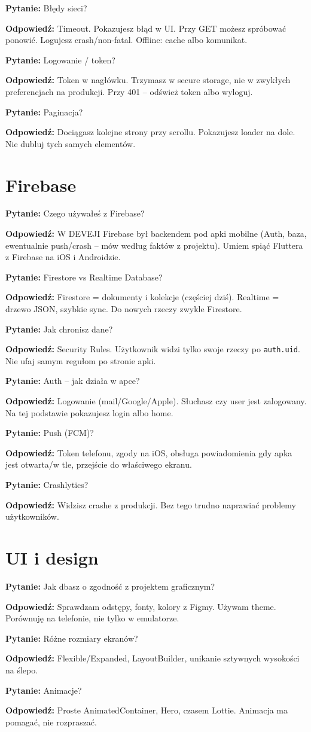 \documentclass[11pt,a4paper]{article}
\newcommand{\pyt}[1]{\par\medskip\noindent\textbf{Pytanie:} #1\par}
\newcommand{\odp}[1]{\noindent\textbf{Odpowiedź:} #1\par}
\begin{document}
\pyt{Błędy sieci?}
\odp{Timeout. Pokazujesz błąd w UI. Przy GET możesz spróbować ponowić. Logujesz crash/non-fatal. Offline: cache albo komunikat.}

\pyt{Logowanie / token?}
\odp{Token w nagłówku. Trzymasz w secure storage, nie w zwykłych preferencjach na produkcji. Przy 401 -- odśwież token albo wyloguj.}

\pyt{Paginacja?}
\odp{Dociągasz kolejne strony przy scrollu. Pokazujesz loader na dole. Nie dubluj tych samych elementów.}

\section{Firebase}

\pyt{Czego używałeś z Firebase?}
\odp{W DEVEJI Firebase był backendem pod apki mobilne (Auth, baza, ewentualnie push/crash -- mów według faktów z projektu). Umiem spiąć Fluttera z Firebase na iOS i Androidzie.}

\pyt{Firestore vs Realtime Database?}
\odp{Firestore = dokumenty i kolekcje (częściej dziś). Realtime = drzewo JSON, szybkie sync. Do nowych rzeczy zwykle Firestore.}

\pyt{Jak chronisz dane?}
\odp{Security Rules. Użytkownik widzi tylko swoje rzeczy po \texttt{auth.uid}. Nie ufaj samym regułom po stronie apki.}

\pyt{Auth -- jak działa w apce?}
\odp{Logowanie (mail/Google/Apple). Słuchasz czy user jest zalogowany. Na tej podstawie pokazujesz login albo home.}

\pyt{Push (FCM)?}
\odp{Token telefonu, zgody na iOS, obsługa powiadomienia gdy apka jest otwarta/w tle, przejście do właściwego ekranu.}

\pyt{Crashlytics?}
\odp{Widzisz crashe z produkcji. Bez tego trudno naprawiać problemy użytkowników.}

\section{UI i design}

\pyt{Jak dbasz o zgodność z projektem graficznym?}
\odp{Sprawdzam odstępy, fonty, kolory z Figmy. Używam theme. Porównuję na telefonie, nie tylko w emulatorze.}

\pyt{Różne rozmiary ekranów?}
\odp{Flexible/Expanded, LayoutBuilder, unikanie sztywnych wysokości na ślepo.}

\pyt{Animacje?}
\odp{Proste AnimatedContainer, Hero, czasem Lottie. Animacja ma pomagać, nie rozpraszać.}
\end{document}

